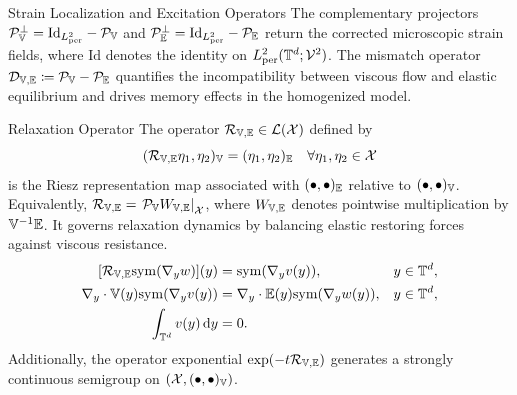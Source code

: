 \documentclass[3p, 12pt, preprint]{elsarticle}
\begin{document}
\begin{namedparagraph}{Strain Localization and Excitation Operators}
The complementary projectors ${\mathcal{P}}^{\perp}_{\mathbb{V}} = \mathrm{Id}_{L^2_{\rm per}} - {\mathcal{P}}_{\mathbb{V}}$ and ${\mathcal{P}}^{\perp}_{\mathbb{E}} = \mathrm{Id}_{L^2_{\rm per}} - {\mathcal{P}}_{\mathbb{E}}$ return the corrected microscopic strain fields, where $\mathrm{Id}$ denotes the identity on $L^2_{\rm per}(\mathbb{T}^d;{\mathcal{V}}^2)$. The mismatch operator ${\mathcal{D}}_{\mathbb{V},\mathbb{E}} \coloneqq {\mathcal{P}}_{\mathbb{V}} - {\mathcal{P}}_{\mathbb{E}}$ quantifies the incompatibility between viscous flow and elastic equilibrium and drives memory effects in the homogenized model.
\end{namedparagraph}

\begin{namedparagraph}{Relaxation Operator}
The operator ${\mathcal{R}}_{\mathbb{V},\mathbb{E}}\in\mathcal{L}({\mathcal{X}})$ defined by
\begin{equation}\label{eq:operator_L}
    ({\mathcal{R}}_{\mathbb{V},\mathbb{E}} \eta_1, \eta_2)_{\mathbb{V}} = (\eta_1, \eta_2)_{\mathbb{E}}\quad\forall \eta_1, \eta_2\in{\mathcal{X}}
\end{equation}
is the Riesz representation map associated with $(\bullet,\bullet)_{\mathbb{E}}$ relative to $(\bullet,\bullet)_{\mathbb{V}}$. {\color{blue}Equivalently, ${\mathcal{R}}_{\mathbb{V},\mathbb{E}}=\left.{\mathcal{P}}_{\mathbb{V}}W_{\mathbb{V},\mathbb{E}}\right|_{{\mathcal{X}}}$, where $W_{\mathbb{V},\mathbb{E}}$ denotes pointwise multiplication by $\mathbb{V}^{-1}\mathbb{E}$.} It governs relaxation dynamics by balancing elastic restoring forces against viscous resistance. 
\begin{subequations}\label{eqns:relaxation_cell}
\begin{align}
[{\mathcal{R}}_{\mathbb{V},\mathbb{E}}{\rm sym}(\nabla_y w)](y) &= {\rm sym}(\nabla_y v(y)),&& y \in \mathbb{T}^d,\\
    \nabla_y \cdot \mathbb{V}(y){\rm sym}(\nabla_y v(y)) &= \nabla_y \cdot \mathbb{E}(y) {\rm sym}(\nabla_y w(y)), && y \in \mathbb{T}^d, \\
    \int_{\mathbb{T}^d} v(y)\,\mathrm{d} y &= 0.
\end{align}
\end{subequations}
Additionally, the operator exponential $\exp(-t{\mathcal{R}}_{\mathbb{V},\mathbb{E}})$ generates a strongly continuous semigroup on $({\mathcal{X}},(\bullet,\bullet)_{\mathbb{V}})$. 
\end{namedparagraph}
\end{document}
